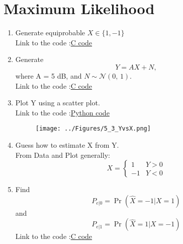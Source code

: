 \documentclass[journal,12pt,twocolumn]{IEEEtran}
\renewcommand\thesection{\arabic{section}}
\begin{document}
\section{Maximum Likelihood}
\begin{enumerate}[label=\thesection.\arabic*
,ref=\thesection.\theenumi]

\item Generate equiprobable $X \in \{1 , -1\}$\\
\solution Link to the code :\href{https://github.com/anikettsatpute/Probability-and-Random-Variable-Assignment/blob/main/code/code5_1.c}{C code}\\
\vspace{0.2in}

\item Generate
\begin{equation}
Y = AX + N,
\end{equation}
where A = 5 dB, and $N \sim \mathcal{N}(0,\,1)$.\\
\solution Link to the code :\href{https://github.com/anikettsatpute/Probability-and-Random-Variable-Assignment/blob/main/code/code5_2.c}{C code}\\
\vspace{0.2in}

\item Plot Y using a scatter plot.\\
\solution Link to the code :\href{https://github.com/anikettsatpute/Probability-and-Random-Variable-Assignment/blob/main/code/code5_3.py}{Python code}\\

\begin{figure}[h]
\centering
\texttt{[image: ../Figures/5\_3\_YvsX.png]}
\caption{}
\label{fig:Y vs X}
\end{figure}

\item Guess how to estimate X from Y.\\
\solution From Data and Plot generally:\\
\begin{equation} \label{eq:54}
X = 
\begin{cases}
1 & Y>0\\
-1 & Y<0
\end{cases}
\end{equation}

\item Find
\begin{equation}
P_{e|0} = \Pr(\hat{X} = -1|X = 1)
\end{equation}
and
\begin{equation}
P_{e|1} = \Pr(\hat{X} = 1|X = -1)
\end{equation}
\solution Link to the code :\href{https://github.com/anikettsatpute/Probability-and-Random-Variable-Assignment/blob/main/code/code5_5.c}{C code}\\


\end{enumerate}
\end{document}
